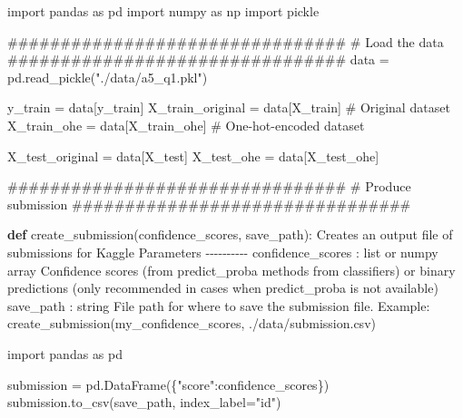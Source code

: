 \documentclass[
  letterpaper,
  DIV=11,
  numbers=noendperiod]{scrartcl}
\newenvironment{Shaded}{\begin{snugshade}}{\end{snugshade}}
\newcommand{\CommentTok}[1]{\textcolor[rgb]{0.37,0.37,0.37}{#1}}
\newcommand{\ImportTok}[1]{\textcolor[rgb]{0.00,0.46,0.62}{#1}}
\newcommand{\KeywordTok}[1]{\textcolor[rgb]{0.00,0.23,0.31}{\textbf{#1}}}
\newcommand{\NormalTok}[1]{\textcolor[rgb]{0.00,0.23,0.31}{#1}}
\newcommand{\OperatorTok}[1]{\textcolor[rgb]{0.37,0.37,0.37}{#1}}
\newcommand{\StringTok}[1]{\textcolor[rgb]{0.13,0.47,0.30}{#1}}
\begin{document}
\begin{Shaded}
\begin{Highlighting}[]
\ImportTok{import}\NormalTok{ pandas }\ImportTok{as}\NormalTok{ pd}
\ImportTok{import}\NormalTok{ numpy }\ImportTok{as}\NormalTok{ np}
\ImportTok{import}\NormalTok{ pickle}

\CommentTok{\#\#\#\#\#\#\#\#\#\#\#\#\#\#\#\#\#\#\#\#\#\#\#\#\#\#\#\#\#\#\#\#}
\CommentTok{\# Load the data}
\CommentTok{\#\#\#\#\#\#\#\#\#\#\#\#\#\#\#\#\#\#\#\#\#\#\#\#\#\#\#\#\#\#\#\#}
\NormalTok{data }\OperatorTok{=}\NormalTok{ pd.read\_pickle(}\StringTok{"./data/a5\_q1.pkl"}\NormalTok{)}

\NormalTok{y\_train }\OperatorTok{=}\NormalTok{ data[}\StringTok{\textquotesingle{}y\_train\textquotesingle{}}\NormalTok{]}
\NormalTok{X\_train\_original }\OperatorTok{=}\NormalTok{ data[}\StringTok{\textquotesingle{}X\_train\textquotesingle{}}\NormalTok{] }\CommentTok{\# Original dataset}
\NormalTok{X\_train\_ohe }\OperatorTok{=}\NormalTok{ data[}\StringTok{\textquotesingle{}X\_train\_ohe\textquotesingle{}}\NormalTok{]  }\CommentTok{\# One{-}hot{-}encoded dataset}

\NormalTok{X\_test\_original }\OperatorTok{=}\NormalTok{ data[}\StringTok{\textquotesingle{}X\_test\textquotesingle{}}\NormalTok{]}
\NormalTok{X\_test\_ohe }\OperatorTok{=}\NormalTok{ data[}\StringTok{\textquotesingle{}X\_test\_ohe\textquotesingle{}}\NormalTok{]}

\CommentTok{\#\#\#\#\#\#\#\#\#\#\#\#\#\#\#\#\#\#\#\#\#\#\#\#\#\#\#\#\#\#\#\#}
\CommentTok{\# Produce submission}
\CommentTok{\#\#\#\#\#\#\#\#\#\#\#\#\#\#\#\#\#\#\#\#\#\#\#\#\#\#\#\#\#\#\#\#}

\KeywordTok{def}\NormalTok{ create\_submission(confidence\_scores, save\_path):}
    \CommentTok{\textquotesingle{}\textquotesingle{}\textquotesingle{}Creates an output file of submissions for Kaggle}
\CommentTok{    }
\CommentTok{    Parameters}
\CommentTok{    {-}{-}{-}{-}{-}{-}{-}{-}{-}{-}}
\CommentTok{    confidence\_scores : list or numpy array}
\CommentTok{        Confidence scores (from predict\_proba methods from classifiers) or}
\CommentTok{        binary predictions (only recommended in cases when predict\_proba is }
\CommentTok{        not available)}
\CommentTok{    save\_path : string}
\CommentTok{        File path for where to save the submission file.}
\CommentTok{    }
\CommentTok{    Example:}
\CommentTok{    create\_submission(my\_confidence\_scores, \textquotesingle{}./data/submission.csv\textquotesingle{})}

\CommentTok{    \textquotesingle{}\textquotesingle{}\textquotesingle{}}
    \ImportTok{import}\NormalTok{ pandas }\ImportTok{as}\NormalTok{ pd}

\NormalTok{    submission }\OperatorTok{=}\NormalTok{ pd.DataFrame(\{}\StringTok{"score"}\NormalTok{:confidence\_scores\})}
\NormalTok{    submission.to\_csv(save\_path, index\_label}\OperatorTok{=}\StringTok{"id"}\NormalTok{)}
\end{Highlighting}
\end{Shaded}
\end{document}
